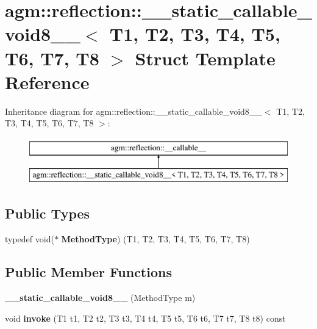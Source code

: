 \hypertarget{structagm_1_1reflection_1_1____static__callable__void8____}{}\section{agm\+:\+:reflection\+:\+:\+\_\+\+\_\+static\+\_\+callable\+\_\+void8\+\_\+\+\_\+$<$ T1, T2, T3, T4, T5, T6, T7, T8 $>$ Struct Template Reference}
\label{structagm_1_1reflection_1_1____static__callable__void8____}
Inheritance diagram for agm\+:\+:reflection\+:\+:\+\_\+\+\_\+static\+\_\+callable\+\_\+void8\+\_\+\+\_\+$<$ T1, T2, T3, T4, T5, T6, T7, T8 $>$\+:\begin{figure}[H]
\begin{center}
\leavevmode
\includegraphics[height=2.000000cm]{structagm_1_1reflection_1_1____static__callable__void8____}
\end{center}
\end{figure}
\subsection*{Public Types}
\begin{DoxyCompactItemize}
\item 
typedef void($\ast$ {\bfseries Method\+Type}) (T1, T2, T3, T4, T5, T6, T7, T8)\hypertarget{structagm_1_1reflection_1_1____static__callable__void8_____a4dad8bfe8b7901c803be1b04654ce3eb}{}\label{structagm_1_1reflection_1_1____static__callable__void8_____a4dad8bfe8b7901c803be1b04654ce3eb}

\end{DoxyCompactItemize}
\subsection*{Public Member Functions}
\begin{DoxyCompactItemize}
\item 
{\bfseries \+\_\+\+\_\+static\+\_\+callable\+\_\+void8\+\_\+\+\_\+} (Method\+Type m)\hypertarget{structagm_1_1reflection_1_1____static__callable__void8_____ad0e81cee05e1705c82fcb57500e1f9b6}{}\label{structagm_1_1reflection_1_1____static__callable__void8_____ad0e81cee05e1705c82fcb57500e1f9b6}

\item 
void {\bfseries invoke} (T1 t1, T2 t2, T3 t3, T4 t4, T5 t5, T6 t6, T7 t7, T8 t8) const \hypertarget{structagm_1_1reflection_1_1____static__callable__void8_____a6a36ec4d93aa56e9c2cca5af440e47bb}{}\label{structagm_1_1reflection_1_1____static__callable__void8_____a6a36ec4d93aa56e9c2cca5af440e47bb}

\end{DoxyCompactItemize}

